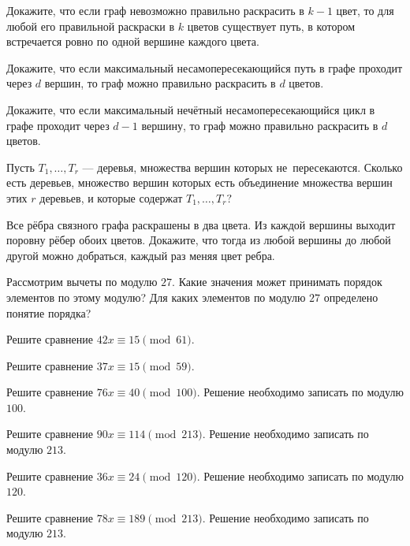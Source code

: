 Докажите, что если граф невозможно правильно раскрасить в $k-1$ цвет, то для любой его правильной раскраски в $k$ цветов существует путь, в котором встречается ровно по одной вершине каждого цвета.

Докажите, что если максимальный несамопересекающийся путь в графе проходит через $d$ вершин,
то граф можно правильно раскрасить в $d$ цветов.

Докажите, что если максимальный нечётный несамопересекающийся цикл в графе проходит через $d-1$ вершину, то граф можно правильно раскрасить в $d$ цветов.

Пусть $T_1,\ldots,T_r$ --- деревья, множества вершин которых не~пересекаются. Сколько есть деревьев, множество вершин которых есть объединение множества вершин этих $r$ деревьев, и которые содержат $T_1,\ldots, T_r?$

Все рёбра связного графа раскрашены в два цвета. Из каждой вершины выходит поровну рёбер обоих цветов. Докажите, что тогда из любой вершины до любой другой можно добраться, каждый раз меняя цвет ребра.

Рассмотрим вычеты по модулю $27$. Какие значения может принимать порядок элементов по этому модулю? Для каких элементов по модулю $27$ определено понятие порядка?

Решите сравнение $42x\equiv 15\pmod{61}$.

Решите сравнение $37x\equiv 15\pmod{59}$.

Решите сравнение $76x\equiv 40\pmod{100}$. Решение необходимо записать по модулю $100$.

Решите сравнение $90x\equiv 114\pmod{213}.$ Решение необходимо записать по модулю $213$.

Решите сравнение $36x\equiv 24\pmod{120}.$ Решение необходимо записать по модулю $120$.

Решите сравнение $78x\equiv 189\pmod{213}$. Решение необходимо записать по модулю $213$.

